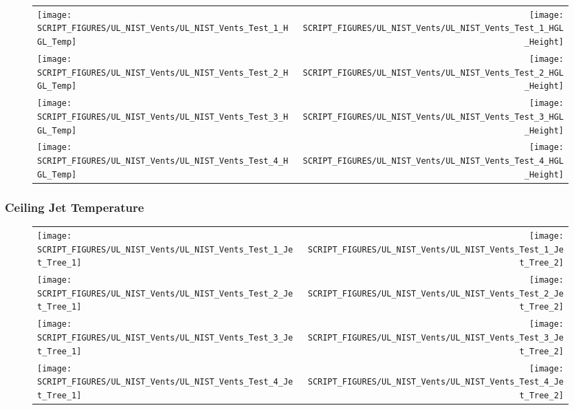 \begin{figure}[!ht]
\begin{tabular*}{\textwidth}{l@{\extracolsep{\fill}}r}
\texttt{[image: SCRIPT\_FIGURES/UL\_NIST\_Vents/UL\_NIST\_Vents\_Test\_1\_HGL\_Temp]} &
\texttt{[image: SCRIPT\_FIGURES/UL\_NIST\_Vents/UL\_NIST\_Vents\_Test\_1\_HGL\_Height]} \\
\texttt{[image: SCRIPT\_FIGURES/UL\_NIST\_Vents/UL\_NIST\_Vents\_Test\_2\_HGL\_Temp]} &
\texttt{[image: SCRIPT\_FIGURES/UL\_NIST\_Vents/UL\_NIST\_Vents\_Test\_2\_HGL\_Height]} \\
\texttt{[image: SCRIPT\_FIGURES/UL\_NIST\_Vents/UL\_NIST\_Vents\_Test\_3\_HGL\_Temp]} &
\texttt{[image: SCRIPT\_FIGURES/UL\_NIST\_Vents/UL\_NIST\_Vents\_Test\_3\_HGL\_Height]} \\
\texttt{[image: SCRIPT\_FIGURES/UL\_NIST\_Vents/UL\_NIST\_Vents\_Test\_4\_HGL\_Temp]} &
\texttt{[image: SCRIPT\_FIGURES/UL\_NIST\_Vents/UL\_NIST\_Vents\_Test\_4\_HGL\_Height]}
\end{tabular*}
\end{figure}

\clearpage

\subsubsection{Ceiling Jet Temperature}

\begin{figure}[!ht]
\begin{tabular*}{\textwidth}{l@{\extracolsep{\fill}}r}
\texttt{[image: SCRIPT\_FIGURES/UL\_NIST\_Vents/UL\_NIST\_Vents\_Test\_1\_Jet\_Tree\_1]} &
\texttt{[image: SCRIPT\_FIGURES/UL\_NIST\_Vents/UL\_NIST\_Vents\_Test\_1\_Jet\_Tree\_2]} \\
\texttt{[image: SCRIPT\_FIGURES/UL\_NIST\_Vents/UL\_NIST\_Vents\_Test\_2\_Jet\_Tree\_1]} &
\texttt{[image: SCRIPT\_FIGURES/UL\_NIST\_Vents/UL\_NIST\_Vents\_Test\_2\_Jet\_Tree\_2]} \\
\texttt{[image: SCRIPT\_FIGURES/UL\_NIST\_Vents/UL\_NIST\_Vents\_Test\_3\_Jet\_Tree\_1]} &
\texttt{[image: SCRIPT\_FIGURES/UL\_NIST\_Vents/UL\_NIST\_Vents\_Test\_3\_Jet\_Tree\_2]} \\
\texttt{[image: SCRIPT\_FIGURES/UL\_NIST\_Vents/UL\_NIST\_Vents\_Test\_4\_Jet\_Tree\_1]} &
\texttt{[image: SCRIPT\_FIGURES/UL\_NIST\_Vents/UL\_NIST\_Vents\_Test\_4\_Jet\_Tree\_2]}
\end{tabular*}
\label{UL_NIST_Ceiling_Jet}
\end{figure}

